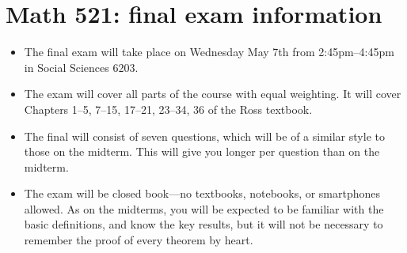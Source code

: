 \documentclass[12pt]{article}
\begin{document}
\section*{Math 521: final exam information}
\begin{itemize}
  \item The final exam will take place on Wednesday May 7th from 2:45pm--4:45pm
    in Social Sciences 6203.
  \item The exam will cover all parts of the course with equal weighting. It
    will cover Chapters 1--5, 7--15, 17--21, 23--34, 36 of the Ross textbook.
  \item The final will consist of seven questions, which will be of a similar
    style to those on the midterm. This will give you longer per question than
    on the midterm.
  \item The exam will be closed book---no textbooks, notebooks, or smartphones
    allowed. As on the midterms, you will be expected to be familiar with the
    basic definitions, and know the key results, but it will not be necessary to
    remember the proof of every theorem by heart.
\end{itemize}
\end{document}
